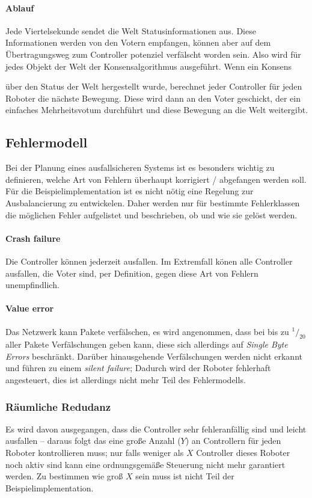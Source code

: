 \paragraph{Ablauf} Jede Viertelsekunde sendet die Welt Statusinformationen aus. Diese Informationen werden von den Votern empfangen, k{\"{o}}nnen
aber auf dem {\"{U}}bertragungsweg zum Controller potenziel verf{\"{a}}lscht worden sein. Also wird f{\"{u}}r jedes Objekt der Welt der Konsensalgorithmus ausgef{\"{u}}hrt. Wenn ein Konsens {\"{u}ber den Status der Welt hergestellt wurde, berechnet 
jeder Controller f{\"{u}}r jeden Roboter die n{\"{a}}chste Bewegung. Diese wird dann an den Voter geschickt, der ein einfaches Mehrheitsvotum durchf{\"{u}}hrt und diese Bewegung an die Welt weitergibt.

\subsection{Fehlermodell} \label{error-model}
Bei der Planung eines ausfallsicheren Systems ist es besonders wichtig zu definieren, welche Art von Fehlern
{\"{u}}berhaupt korrigiert / abgefangen werden soll. F{\"{u}}r die Beispielimplementation ist es nicht
n{\"{o}}tig eine Regelung zur Ausbalancierung zu entwickelen. Daher werden nur f{\"{u}}r bestimmte Fehlerklassen
die m{\"{o}}glichen Fehler aufgelistet und beschrieben, ob und wie sie gel{\"{o}}st werden.

\paragraph{Crash failure} Die Controller k{\"{o}}nnen jederzeit ausfallen. Im Extremfall k{\"{o}}nen alle Controller ausfallen, die Voter sind, per Definition, gegen diese Art von Fehlern unempfindlich.

\paragraph{Value error} Das Netzwerk kann Pakete verf{\"{a}}lschen, es wird angenommen, dass bei bis zu
$^1/_{20}$ aller Pakete Verf{\"{a}}lschungen geben kann, diese sich allerdings auf
\textit{Single Byte Errors} beschr{\"{a}}nkt. Dar{\"{u}}ber hinausgehende Verf{\"{a}}lschungen werden nicht
erkannt und f{\"{u}}hren zu einem \textit{silent failure}; Dadurch wird der Roboter fehlerhaft angesteuert,
dies ist allerdings nicht mehr Teil des Fehlermodells.

\subsubsection{R{\"{a}}umliche Redudanz}
Es wird davon ausgegangen, dass die Controller sehr fehleranf{\"{a}}llig sind und leicht ausfallen --
daraus folgt das eine gro{\ss}e Anzahl ($Y$) an Controllern f{\"{u}}r jeden Roboter kontrollieren muss;
nur falls weniger als $X$ Controller dieses Roboter noch aktiv sind kann eine ordnungsgem{\"{a}}{\ss}e
Steuerung nicht mehr garantiert werden. Zu bestimmen wie gro{\ss} $X$ sein muss ist nicht Teil der
Beispielimplementation.

}
